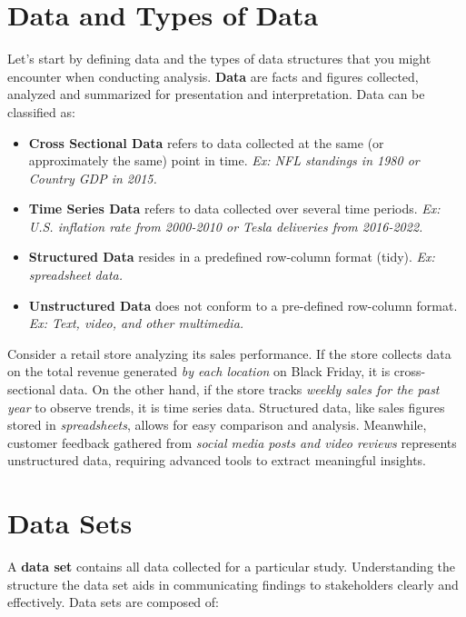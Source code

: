 \documentclass[
  11pt,
  letterpaper,
  DIV=11,
  numbers=noendperiod,
  oneside,
  open=any]{scrreprt}
\begin{document}
\section{Data and Types of Data}\label{data-and-types-of-data}

Let's start by defining data and the types of data structures that you
might encounter when conducting analysis. \textbf{Data} are facts and
figures collected, analyzed and summarized for presentation and
interpretation. Data can be classified as:

\begin{itemize}
\item
  \textbf{Cross Sectional Data} refers to data collected at the same (or
  approximately the same) point in time. \emph{Ex: NFL standings in 1980
  or Country GDP in 2015.}
\item
  \textbf{Time Series Data} refers to data collected over several time
  periods. \emph{Ex: U.S. inflation rate from 2000-2010 or Tesla
  deliveries from 2016-2022.}
\item
  \textbf{Structured Data} resides in a predefined row-column format
  (tidy). \emph{Ex: spreadsheet data.}
\item
  \textbf{Unstructured Data} does not conform to a pre-defined
  row-column format. \emph{Ex: Text, video, and other multimedia.}
\end{itemize}

\begin{bsexample}[Example]

Consider a retail store analyzing its sales performance. If the store
collects data on the total revenue generated \emph{by each location} on
Black Friday, it is cross-sectional data. On the other hand, if the
store tracks \emph{weekly sales for the past year} to observe trends, it
is time series data. Structured data, like sales figures stored in
\emph{spreadsheets}, allows for easy comparison and analysis. Meanwhile,
customer feedback gathered from \emph{social media posts and video
reviews} represents unstructured data, requiring advanced tools to
extract meaningful insights.

\end{bsexample}

\section{Data Sets}\label{data-sets}

A \textbf{data set} contains all data collected for a particular study.
Understanding the structure the data set aids in communicating findings
to stakeholders clearly and effectively. Data sets are composed of:
\end{document}

